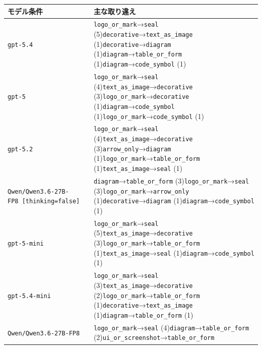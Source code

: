 \documentclass[
]{article}
\newcounter{none} %
\begin{document}
{\def\LTcaptype{none} %
\begin{longtable}[]{@{}
  >{\raggedright\arraybackslash}p{}
  >{\raggedright\arraybackslash}p{}@{}}
\toprule\noalign{}
\begin{minipage}[b]{\linewidth}\raggedright
モデル条件
\end{minipage} & \begin{minipage}[b]{\linewidth}\raggedright
主な取り違え
\end{minipage} \\
\midrule\noalign{}
\endhead
\bottomrule\noalign{}
\endlastfoot
\texttt{gpt-5.4} & \texttt{logo\_or\_mark}→\texttt{seal}
(5)\texttt{decorative}→\texttt{text\_as\_image}
(1)\texttt{decorative}→\texttt{diagram}
(1)\texttt{diagram}→\texttt{table\_or\_form}
(1)\texttt{diagram}→\texttt{code\_symbol} (1) \\
\texttt{gpt-5} & \texttt{logo\_or\_mark}→\texttt{seal}
(4)\texttt{text\_as\_image}→\texttt{decorative}
(3)\texttt{logo\_or\_mark}→\texttt{decorative}
(1)\texttt{diagram}→\texttt{code\_symbol}
(1)\texttt{logo\_or\_mark}→\texttt{code\_symbol} (1) \\
\texttt{gpt-5.2} & \texttt{logo\_or\_mark}→\texttt{seal}
(4)\texttt{text\_as\_image}→\texttt{decorative}
(3)\texttt{arrow\_only}→\texttt{diagram}
(1)\texttt{logo\_or\_mark}→\texttt{table\_or\_form}
(1)\texttt{text\_as\_image}→\texttt{seal} (1) \\
\texttt{Qwen/Qwen3.6-27B-FP8\ {[}thinking=false{]}} &
\texttt{diagram}→\texttt{table\_or\_form}
(3)\texttt{logo\_or\_mark}→\texttt{seal}
(3)\texttt{logo\_or\_mark}→\texttt{arrow\_only}
(1)\texttt{decorative}→\texttt{diagram}
(1)\texttt{diagram}→\texttt{code\_symbol} (1) \\
\texttt{gpt-5-mini} & \texttt{logo\_or\_mark}→\texttt{seal}
(5)\texttt{text\_as\_image}→\texttt{decorative}
(3)\texttt{logo\_or\_mark}→\texttt{table\_or\_form}
(1)\texttt{text\_as\_image}→\texttt{seal}
(1)\texttt{diagram}→\texttt{code\_symbol} (1) \\
\texttt{gpt-5.4-mini} & \texttt{logo\_or\_mark}→\texttt{seal}
(3)\texttt{text\_as\_image}→\texttt{decorative}
(2)\texttt{logo\_or\_mark}→\texttt{table\_or\_form}
(1)\texttt{decorative}→\texttt{text\_as\_image}
(1)\texttt{diagram}→\texttt{table\_or\_form} (1) \\
\texttt{Qwen/Qwen3.6-27B-FP8} & \texttt{logo\_or\_mark}→\texttt{seal}
(4)\texttt{diagram}→\texttt{table\_or\_form}
(2)\texttt{ui\_or\_screenshot}→\texttt{table\_or\_form}

\end{longtable}}
\end{document}
